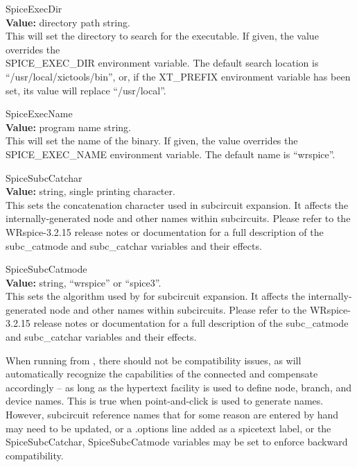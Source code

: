 \begin{description}
\item{\et SpiceExecDir}\\
{\bf Value:} directory path string.\\
This will set the directory to search for the {\WRspice} executable. 
If given, the value overrides the\\ {\et SPICE\_EXEC\_DIR} environment
variable.  The default search location is ``{\vt /usr/local/xictools/bin}'',
or, if the {\et XT\_PREFIX} environment variable has been set, its
value will replace ``{\vt /usr/local}''.

\item{\et SpiceExecName}\\
{\bf Value:} program name string.\\
This will set the name of the {\WRspice} binary.  If given, the value
overrides the {\et SPICE\_EXEC\_NAME} environment variable.  The
default name is ``{\vt wrspice}''.

\item{\et SpiceSubcCatchar}\\
{\bf Value:} string, single printing character.\\
This sets the concatenation character used in {\WRspice} subcircuit
expansion.  It affects the internally-generated node and other names
within subcircuits.  Please refer to the WRspice-3.2.15 release notes
or documentation for a full description of the {\WRspice} {\et
subc\_catmode} and {\et subc\_catchar} variables and their effects.

\item{\et SpiceSubcCatmode}\\
{\bf Value:} string, ``{\vt wrspice}'' or ``{\vt spice3}''.\\
This sets the algorithm used by {\WRspice} for subcircuit expansion. 
It affects the internally-generated node and other names within
subcircuits.  Please refer to the WRspice-3.2.15 release notes or
documentation for a full description of the {\WRspice} {\et
subc\_catmode} and {\et subc\_catchar} variables and their effects.
\end{description}

When running {\WRspice} from {\Xic}, there should not be
compatibility issues, as {\Xic} will automatically recognize the
capabilities of the connected {\WRspice} and compensate accordingly
-- as long as the hypertext facility is used to define node, branch,
and device names.  This is true when point-and-click is used to
generate names.  However, subcircuit reference names that for some
reason are entered by hand may need to be updated, or a {\vt
.options} line added as a spicetext label, or the {\et
SpiceSubcCatchar}, {\et SpiceSubcCatmode} variables may be set to
enforce backward compatibility.

